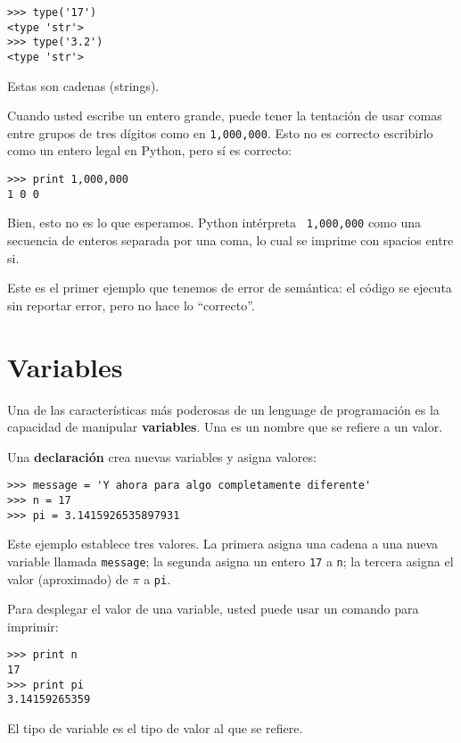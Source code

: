 
\beforeverb
\begin{verbatim}
>>> type('17')
<type 'str'>
>>> type('3.2')
<type 'str'>
\end{verbatim}
\afterverb
%
Estas son cadenas (strings).

Cuando usted escribe un entero grande, puede tener la tentaci\'on de usar comas entre grupos de tres d\'igitos como en {\tt 1,000,000}. Esto no es correcto escribirlo como un entero legal en Python, pero s\'i es correcto:

\beforeverb
\begin{verbatim}
>>> print 1,000,000
1 0 0
\end{verbatim}
\afterverb
%
Bien, esto no es lo que esperamos. Python int\'erpreta {\tt
  1,000,000} como una secuencia de enteros separada por una coma, lo cual se imprime con spacios entre si.


Este es el primer ejemplo que tenemos de error de sem\'antica: el c\'odigo se ejecuta sin reportar error, pero no hace lo ``correcto''.


\section{Variables}

Una de las caracter\'isticas m\'as poderosas de un lenguage de programaci\'on es la capacidad de manipular  {\bf variables}. Una es un nombre que se refiere a un valor.

Una {\bf declaraci\'on} crea nuevas variables y asigna valores:

\beforeverb
\begin{verbatim}
>>> message = 'Y ahora para algo completamente diferente'
>>> n = 17
>>> pi = 3.1415926535897931
\end{verbatim}
\afterverb
%
Este ejemplo establece tres valores. La primera asigna una cadena a una nueva variable llamada {\tt message};
la segunda asigna un entero {\tt 17} a {\tt n}; la tercera asigna el valor (aproximado) de $\pi$ a {\tt pi}.

Para desplegar el valor de una variable, usted puede usar un comando para imprimir:

\beforeverb
\begin{verbatim}
>>> print n
17
>>> print pi
3.14159265359
\end{verbatim}
\afterverb
%
El tipo de variable es el tipo de valor al que se refiere.

